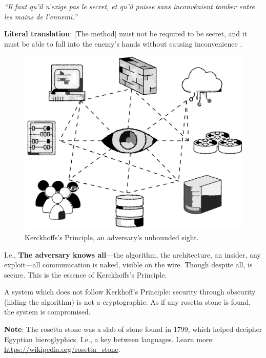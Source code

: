 \begin{theo}

    \label{theo:kerckhoffs}
    \begin{center}
        \Large\textit{``Il faut qu'il n'exige pas le secret, et qu'il puisse sans inconvénient tomber entre
        les mains de l'ennemi.''}
    \end{center}

    \vspace{1em}
    \normalsize

    \noindent
    \textbf{Literal translation}: [The method] must not be required to be secret, and it
    must be able to fall into the enemy's hands without causing inconvenience \cite{joyofcryptography}.
\end{theo}

\begin{figure}[h!]
    \centering
    \includegraphics[width=.6\textwidth]{Sections/sec/enc/enemy.png}
    \caption{Kerckhoffs's Principle, an adversary's unbounded sight.}
    \label{fig:kerckhoffs}
\end{figure}

\noindent
I.e., \textbf{The adversary knows all}---the algorithm, the architecture, an insider, any exploit---all communication is naked, visible on the wire.
Though despite all, is secure. This is the essence of Kerckhoffs's Principle.

\newpage

\begin{Def}

    \label{def:non_crypto}
    A system which does not follow Kerkhoff's Principle: security through obscurity (hiding the algorithm) is not a cryptographic. As 
    if any rosetta stone is found, the system is compromised.
\end{Def}

\vspace{-1em}
\begin{Note}
    \textbf{Note}: The rosetta stone was a slab of stone found in 1799, which helped decipher Egyptian hieroglyphics. I.e., a key between languages.
    Learn more: \href{https://en.wikipedia.org/wiki/Rosetta_Stone}{https://wikipedia.org/rosetta\_stone}.
\end{Note}

